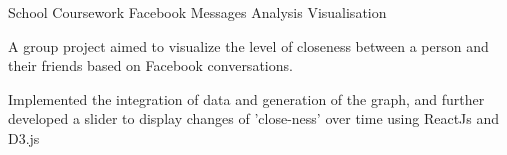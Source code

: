 \begin{cventries}
\cventry
    {School Coursework} %
    {Facebook Messages Analysis Visualisation} %
    {} %
    {} %
    {
     \begin{cvitems} %
        \item {A group project aimed to visualize the level of closeness between a person and their friends based on Facebook conversations.}
        \item {Implemented the integration of data and generation of the graph, and further developed a slider to display changes of 'close-ness' over time using ReactJs and D3.js}
      \end{cvitems}
    }




\end{cventries}


